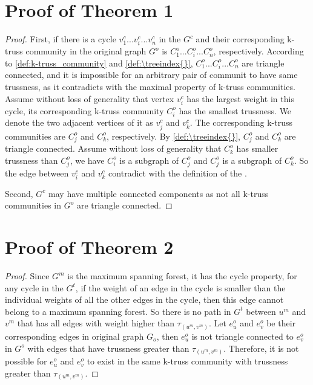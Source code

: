 % 
\appendix

\section{Proof of Theorem 1}
\begin{proof}
First, if there is a cycle $v^{c}_{1} ... v^{c}_{i} ... v^{c}_{n}$ in the \treeindex{} $G^c$ and their corresponding k-truss community in the original graph $G^o$ is $C^{o}_{1} ... C^{o}_{i} ... C^{o}_{n}$, respectively. According to \autoref{def:k-truss_community} and \autoref{def:\treeindex{}}, $C^{o}_{1} ... C^{o}_{i} ... C^{o}_{n}$ are triangle connected, and it is impossible for an arbitrary pair of communit to have same trussness, as it contradicts with the maximal property of k-truss communities. Assume without loss of generality that vertex $v^{c}_{i}$ has the largest weight in this cycle, \ie its corresponding k-truss community $C^{o}_{i}$ has the smallest trussness. We denote the two adjacent vertices of it as $v^{c}_{j}$ and $v^{c}_{k}$. The corresponding k-truss communities are $C^{o}_{j}$ and $C^{o}_{k}$, respectively. By \autoref{def:\treeindex{}}, $C^{o}_{j}$ and $C^{o}_{k}$ are triangle connected. Assume without loss of generality that $C^{o}_{k}$ has smaller trussness than $C^{o}_{j}$, we have $C^{o}_{i}$ is a subgraph of $C^{o}_{j}$ and $C^{o}_{j}$ is a subgraph of $C^{o}_{k}$. So the edge between $v^{c}_{i}$ and $v^{c}_{k}$ contradict with the definition of the \treeindex{}.

Second, $G^c$ may have multiple connected components as not all k-truss communities in $G^o$ are triangle connected. 
\end{proof}

\section{Proof of Theorem 2}
\begin{proof}
Since $G^m$ is the maximum spanning forest, it has the cycle property, \ie for any cycle in the \inducedgraph{} $G^t$, if the weight of an edge in the cycle is smaller than the individual weights of all the other edges in the cycle, then this edge cannot belong to a maximum spanning forest. So there is no path in $G^t$ between $u^m$ and $v^m$ that has all edges with weight higher than $\tau_{(u^m,v^m)}$. Let $e^{o}_{u}$ and $e^{o}_{v}$ be their corresponding edges in original graph $G_o$, then $e^{o}_{u}$ is not triangle connected to $e^{o}_{v}$ in $G^o$ with edges that have trussness greater than $\tau_{(u^m,v^m)}$. Therefore, it is not possible for $e^{o}_{u}$ and $e^{o}_{v}$ to exist in the same k-truss community with trussness greater than $\tau_{(u^m,v^m)}$.
\end{proof}
